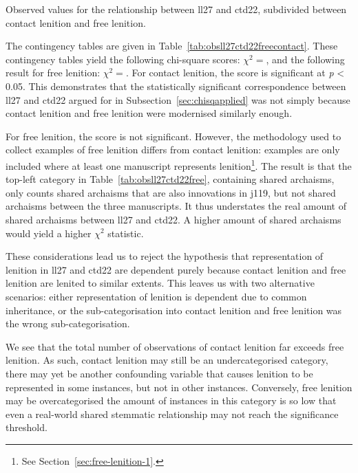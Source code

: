 \begin{table}[h]
  \centering
  \hfill
  \caption{Observed values for the relationship between \gls{ll27} and \gls{ctd22}, subdivided between contact lenition and free lenition.}
  \label{tab:obsll27ctd22freecontact}
\end{table}
The contingency tables are given in Table~\ref{tab:obsll27ctd22freecontact}. These contingency tables yield the following chi-square scores: \(\chi^2 = \), and the following result for free lenition: \(\chi^2 = \). For contact lenition, the score is significant at \emph{p} < 0.05. This demonstrates that the statistically significant correspondence between \gls{ll27} and \gls{ctd22} argued for in Subsection~\ref{sec:chisqapplied} was not simply because contact lenition and free lenition were modernised similarly enough. 

For free lenition, the score is not significant. However, the methodology used to collect examples of free lenition differs from contact lenition: examples are only included where at least one manuscript represents lenition\footnote{See Section~\ref{sec:free-lenition-1}.}. The result is that the top-left category in Table~\ref{tab:obsll27ctd22free}, containing shared archaisms, only counts shared archaisms that are also innovations in \gls{j119}, but not shared archaisms between the three manuscripts. It thus understates the real amount of shared archaisms between \gls{ll27} and \gls{ctd22}. A higher amount of shared archaisms would yield a higher \(\chi^2\) statistic.

These considerations lead us to reject the hypothesis that representation of lenition in \gls{ll27} and \gls{ctd22} are dependent purely because contact lenition and free lenition are lenited to similar extents. This leaves us with two alternative scenarios: either representation of lenition is dependent due to common inheritance, or the sub-categorisation into contact lenition and free lenition was the wrong sub-categorisation.

We see that the total number of observations of contact lenition far exceeds free lenition. As such, contact lenition may still be an undercategorised category, \ie there may yet be another confounding variable that causes lenition to be represented in some instances, but not in other instances. Conversely, free lenition may be overcategorised \ie the amount of instances in this category is so low that even a real-world shared stemmatic relationship may not reach the significance threshold. 

